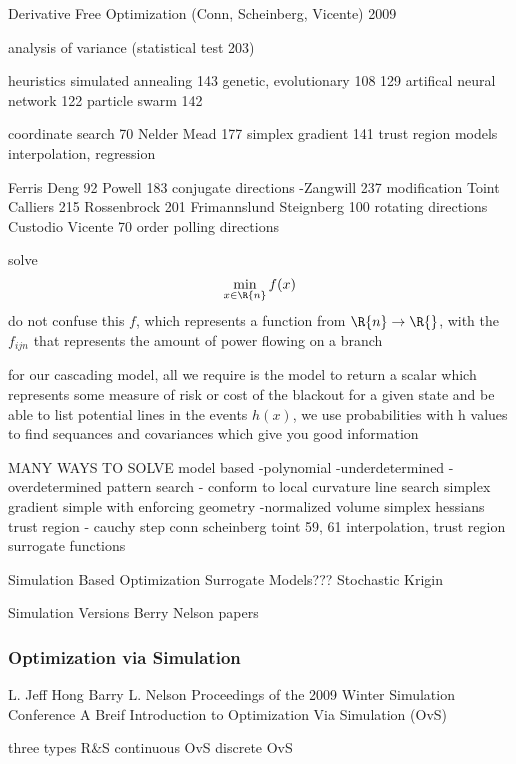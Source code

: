 
Derivative Free Optimization  (Conn, Scheinberg, Vicente) 2009  \cite{conn_2009}

analysis of variance (statistical test 203)

heuristics
simulated annealing 143
genetic, evolutionary 108 129
artifical neural network 122
particle swarm 142

coordinate search 70
Nelder Mead 177
simplex gradient 141
trust region models
interpolation, regression

Ferris Deng 92
Powell 183 conjugate directions
-Zangwill 237 modification
Toint Calliers 215
Rossenbrock 201
Frimannslund Steignberg 100 rotating directions
Custodio Vicente 70 order polling directions


solve
\begin{equation}
\min_{x \in \R{n}} f(x) 
\end{equation}
do not confuse this $f$, which represents a function from $\R{n} \rightarrow \R{}$, with the $f_{ijn}$ that represents the amount of power flowing on a branch

for our cascading model, all we require is the model to return a scalar which represents some measure of risk or cost of the blackout for a given state and be able to list potential lines in the events $h(x)$, we use probabilities with h values to find sequances and covariances which give you good information

MANY WAYS TO SOLVE
model based -polynomial -underdetermined -overdetermined
pattern search - conform to local curvature
line search
simplex gradient
simple with enforcing geometry -normalized volume
simplex hessians
trust region - cauchy step
conn scheinberg toint 59, 61	interpolation, trust region
surrogate functions


Simulation Based Optimization
Surrogate Models??? Stochastic Krigin


Simulation Versions
Berry Nelson papers

\subsubsection{Optimization via Simulation}


L. Jeff Hong
Barry L. Nelson
Proceedings of the 2009 Winter Simulation Conference
A Breif Introduction to Optimization Via Simulation (OvS) \cite{hong_2009}

three types
R\&S
continuous OvS
discrete OvS

